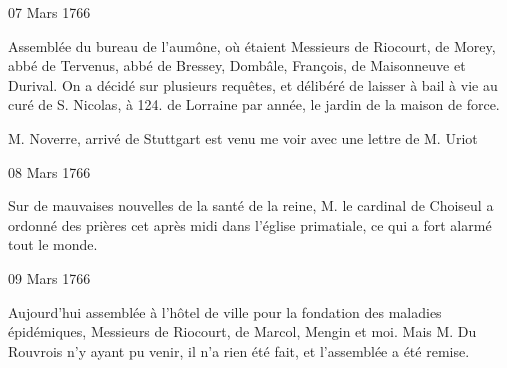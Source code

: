                      \begin{diary}{07 Mars 1766}{}

                         Assemblée du bureau de l'aumône, où étaient
                           Messieurs
                           de Riocourt, de Morey, abbé de
                              Tervenus,
                           abbé de Bressey, Dombâle, François, de
                              Maisonneuve et Durival. On a décidé sur
                           plusieurs requêtes, et délibéré de laisser à bail
                           à vie au curé de S.
                              Nicolas, à 124.\up{\#} de
                              Lorraine par année, le jardin
                              de la maison de force.
                        \bigskip



                           M. Noverre, arrivé de Stuttgart est venu
                           me voir avec une lettre de M.
                              Uriot
                        \bigskip


                     \end{diary}

                     \begin{diary}{08 Mars 1766}{}

                         Sur de mauvaises nouvelles de la santé
                           de la reine,
                              M. le cardinal de Choiseul
                           a ordonné des prières cet après midi
                           dans l’église
                              primatiale, ce qui a fort
                           alarmé tout le monde. \bigskip


                     \end{diary}

                     \begin{diary}{09 Mars 1766}{}

                         Aujourd'hui assemblée à l'hôtel de ville
                           pour la fondation des maladies
                              épidémiques,
                           Messieurs
                           de Riocourt, de Marcol, Mengin
                           et moi. Mais M. Du Rouvrois n'y ayant
                           pu venir, il n'a rien été fait, et l'assemblée
                           a été remise. \bigskip


                     \end{diary}

